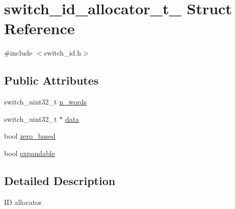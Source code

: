 \hypertarget{structswitch__id__allocator__t__}{\section{switch\+\_\+id\+\_\+allocator\+\_\+t\+\_\+ Struct Reference}
\label{structswitch__id__allocator__t__}
}


{\ttfamily \#include $<$switch\+\_\+id.\+h$>$}

\subsection*{Public Attributes}
\begin{DoxyCompactItemize}
\item 
switch\+\_\+uint32\+\_\+t \hyperlink{structswitch__id__allocator__t___ad1a0dcf013819fc1b61345f44d9392f1}{n\+\_\+words}
\item 
switch\+\_\+uint32\+\_\+t $\ast$ \hyperlink{structswitch__id__allocator__t___a3b40d71c7121a6ec4a1e834cafee25d5}{data}
\item 
bool \hyperlink{structswitch__id__allocator__t___ab72fd8f75212b68abb7adb915793039c}{zero\+\_\+based}
\item 
bool \hyperlink{structswitch__id__allocator__t___ae9d5d35cf95c82c05c1d5315edca6c34}{expandable}
\end{DoxyCompactItemize}


\subsection{Detailed Description}
I\+D allocator 

